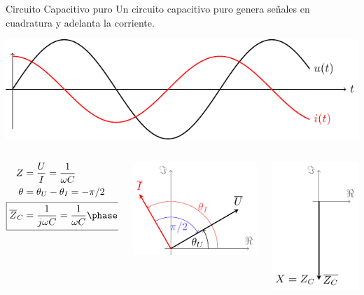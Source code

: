 \documentclass[aspectratio=169, usenames,svgnames,dvipsnames]{beamer}
\begin{document}
\begin{frame}[label={sec:orgcc24166}]{Circuito Capacitivo puro}
Un circuito capacitivo puro genera \alert{señales en cuadratura} y \alert{adelanta la corriente}.

\begin{center}
\includegraphics[height=0.3\textheight]{../figs/capacitivoPuro.pdf}
\end{center}

\begin{columns}
\begin{column}{0.3\columnwidth}
\begin{align*}
  Z &= \frac{U}{I} = \frac{1}{\omega C}\\
  \theta &= \theta_U - \theta_I = - \pi/2\\
  \Aboxed{\overline{Z}_C &= \frac{1}{j\omega C} = \frac{1}{\omega C}\phase{\ang{-90}}}
\end{align*}
\end{column}


\begin{column}{0.4\columnwidth}
\begin{center}
\includegraphics[height=0.4\textheight]{../figs/fasorCondensador_VI.pdf}
\end{center}
\end{column}


\begin{column}{0.3\columnwidth}
\begin{center}
\includegraphics[height=0.4\textheight]{../figs/fasorCondensador.pdf}
\end{center}
\end{column}
\end{columns}
\end{frame}
\end{document}
